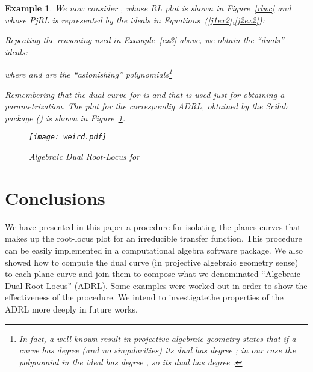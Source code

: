 \documentclass{article}
\newtheorem{example}{Example}[section]
\begin{document}
\begin{example} \em \label{ex4} We now consider , 
whose RL plot is shown in Figure~\ref{rlwc} and whose PjRL is represented by the ideals 
in Equations~(\ref{j1ex2},\ref{j2ex2}):


Repeating the reasoning used in Example~\ref{ex3} above, we obtain the ``duals'' ideals:

where  and  are the ``astonishing'' polynomials\footnote{In fact, a well known result in projective algebraic geometry
states that if a curve has degree  (and no singularities) its dual has degree  \cite[pp.~173]{gray}; 
in our case the polynomial in the ideal  has degree , so its dual has degree .}

Remembering that the dual curve for  is  and
that  is used just for obtaining a parametrization. The plot for the correspondig ADRL, 
obtained by the Scilab package (\cite{scilab}) is shown in Figure~\ref{darlex4}.


\begin{figure}
\begin{center}
\texttt{[image: weird.pdf]}
\caption{\label{darlex4} Algebraic Dual Root-Locus for } 
\end{center}
\end{figure} 

\end{example}


\section{Conclusions}
We have presented in this paper a procedure for isolating the planes curves that makes up 
the root-locus plot for an irreducible transfer function. This procedure can be easily implemented 
in a computational algebra software package. We also showed how to compute the dual curve
(in projective algebraic geometry sense) to each plane curve and join them to compose what 
we denominated ``Algebraic Dual Root Locus'' (ADRL). Some examples were worked out in order to show 
the effectiveness of the procedure. We intend to investigatethe properties of the ADRL 
more deeply in future works.



 
\end{document}
